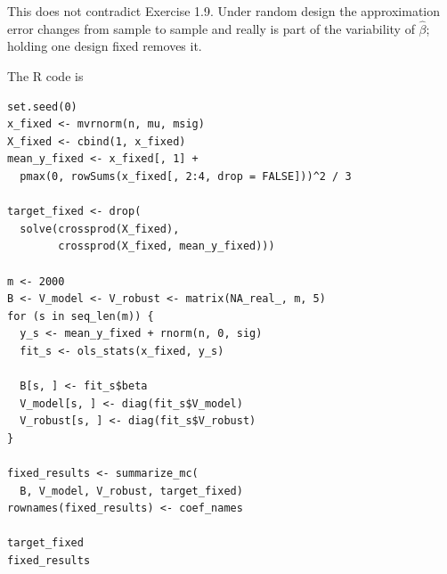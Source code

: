 \documentclass[answers,12pt,addpoints]{exam}
\begin{document}
\begin{questions}
\begin{solution}
This does not contradict Exercise 1.9. Under random design the approximation
error changes from sample to sample and really is part of the variability of
$\widehat\beta$; holding one design fixed removes it.
 
The R code is
\begin{lstlisting}
set.seed(0)
x_fixed <- mvrnorm(n, mu, msig)
X_fixed <- cbind(1, x_fixed)
mean_y_fixed <- x_fixed[, 1] +
  pmax(0, rowSums(x_fixed[, 2:4, drop = FALSE]))^2 / 3
 
target_fixed <- drop(
  solve(crossprod(X_fixed),
        crossprod(X_fixed, mean_y_fixed)))
 
m <- 2000
B <- V_model <- V_robust <- matrix(NA_real_, m, 5)
for (s in seq_len(m)) {
  y_s <- mean_y_fixed + rnorm(n, 0, sig)
  fit_s <- ols_stats(x_fixed, y_s)
 
  B[s, ] <- fit_s$beta
  V_model[s, ] <- diag(fit_s$V_model)
  V_robust[s, ] <- diag(fit_s$V_robust)
}
 
fixed_results <- summarize_mc(
  B, V_model, V_robust, target_fixed)
rownames(fixed_results) <- coef_names
 
target_fixed
fixed_results
\end{lstlisting}
\end{solution}
 
\end{questions}
\end{document}
